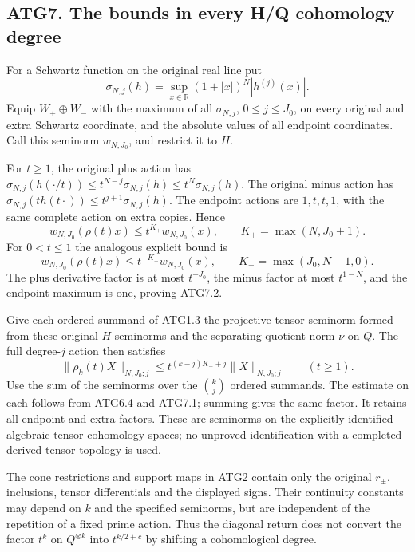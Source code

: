 \subsection{ATG7. The bounds in every H/Q cohomology
degree}\label{atg7.-the-bounds-in-every-hq-cohomology-degree}

For a Schwartz function on the original real line put \[
\sigma_{N,j}(h)=\sup_{x\in\mathbb R}(1+|x|)^N|h^{(j)}(x)|.
\] Equip \(W_+\oplus W_-\) with the maximum of all \(\sigma_{N,j}\),
\(0\le j\le J_0\), on every original and extra Schwartz coordinate, and
the absolute values of all endpoint coordinates. Call this seminorm
\(w_{N,J_0}\), and restrict it to \(H\).

For \(t\ge1\), the original plus action has
\(\sigma_{N,j}(h(\cdot/t))\le t^{N-j}\sigma_{N,j}(h)\le t^N\sigma_{N,j}(h)\).
The original minus action has
\(\sigma_{N,j}(t h(t\cdot))\le t^{j+1}\sigma_{N,j}(h)\). The endpoint
actions are \(1,t,t,1\), with the same complete action on extra copies.
Hence \[
w_{N,J_0}(\rho(t)x)\le t^{K_+}w_{N,J_0}(x),
\qquad K_+=\max(N,J_0+1).
\tag{ATG7.1}
\] For \(0<t\le1\) the analogous explicit bound is \[
w_{N,J_0}(\rho(t)x)\le t^{-K_-}w_{N,J_0}(x),
\qquad K_-=\max(J_0,N-1,0).
\tag{ATG7.2}
\] The plus derivative factor is at most \(t^{-J_0}\), the minus factor
at most \(t^{1-N}\), and the endpoint maximum is one, proving ATG7.2.

Give each ordered summand of ATG1.3 the projective tensor seminorm
formed from these original \(H\) seminorms and the separating quotient
norm \(\nu\) on \(Q\). The full degree-\(j\) action then satisfies \[
\boxed{\|\rho_k(t)X\|_{N,J_0;j}
 \le t^{(k-j)K_++j}\|X\|_{N,J_0;j}\qquad(t\ge1).}
\tag{ATG7.3}
\] Use the sum of the seminorms over the \(\binom{k}{j}\) ordered
summands. The estimate on each follows from ATG6.4 and ATG7.1; summing
gives the same factor. It retains all endpoint and extra factors. These
are seminorms on the explicitly identified algebraic tensor cohomology
spaces; no unproved identification with a completed derived tensor
topology is used.

The cone restrictions and support maps in ATG2 contain only the original
\(r_\pm\), inclusions, tensor differentials and the displayed signs.
Their continuity constants may depend on \(k\) and the specified
seminorms, but are independent of the repetition of a fixed prime
action. Thus the diagonal return does not convert the factor \(t^k\) on
\(Q^{\otimes k}\) into \(t^{k/2+c}\) by shifting a cohomological degree.

